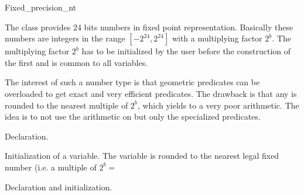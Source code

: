 
\begin{ccClass}{Fixed_precision_nt}

\label{I1_Chapter_Fixed_precision_nt}

The class  provides 24 bits numbers in 
fixed point representation.
Basically these numbers are integers in the range
$[-2^{24},2^{24}]$ with a multiplying factor $2^b$.
The multiplying factor $2^b$ has to be initialized by the user
before the construction of the first 
and is common to all variables.

The interest of such a number type is that geometric predicates
can be overloaded to get exact and very efficient predicates.
The drawback is that any  is rounded to 
the nearest multiple of $2^b$, which yields to a very poor arithmetic.
The idea is to not use the arithmetic on 
but only the specialized predicates.


\ccSetTwoColumns{}{\hspace*{6.5cm}}

\ccCreation
{}


            {Declaration.}

            {Initialization of a variable. The variable is rounded to the
                nearest legal fixed number (i.e. a multiple of $2^b=$
                }


            {Declaration and initialization.}



\end{ccClass}
